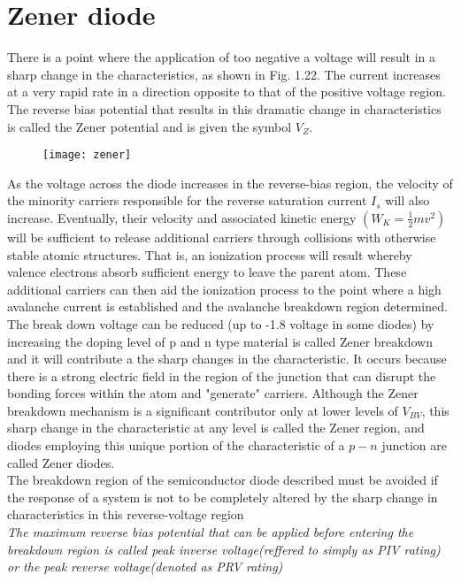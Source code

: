\section{Zener diode}
There is a point where the application of too negative a voltage will result in a sharp change in the characteristics, as shown in Fig. 1.22. The current increases at a very rapid rate
in a direction opposite to that of the positive voltage region. The reverse bias potential that results in this dramatic change in characteristics is called the Zener potential
and is given the symbol $V_ Z $.
\begin{figure}[H]
\centering
\texttt{[image: zener]}
\caption{}
\label{}
\end{figure}
\par As the voltage across the diode increases in the reverse-bias region, the velocity of the minority carriers responsible for the reverse saturation current $I_{s}$ will also increase. Eventually, their velocity and associated kinetic energy $\left(W_{K}=\frac{1}{2} m v^{2}\right)$ will be sufficient to release additional carriers through collisions with otherwise stable atomic structures. That is, an ionization process will result whereby valence electrons absorb sufficient energy to leave the parent atom. These additional carriers can then aid the ionization process to the point where a high avalanche current is established and the avalanche breakdown region determined.\\
The break down voltage can be reduced (up to -1.8 voltage in some diodes) by increasing the doping level of p and n type material is called Zener breakdown and it will contribute a the sharp changes in the characteristic. It occurs because there is a strong electric field in the region of the junction that can disrupt the bonding forces within the atom and "generate" carriers. Although the Zener breakdown mechanism is a significant contributor only at lower levels of $V_{B V}$, this sharp change in the characteristic at any level is called the Zener region, and diodes employing this unique portion of the characteristic of a  $p-n$ junction are called Zener diodes.\\
 The breakdown region of the semiconductor diode described must be avoided if the response of a system is not to be completely altered by the sharp change in characteristics in this reverse-voltage region\\
 \textit{The maximum reverse bias potential that can be applied before entering the breakdown region is called peak inverse voltage(reffered to simply as PIV rating) or the peak reverse voltage(denoted as PRV rating)}
